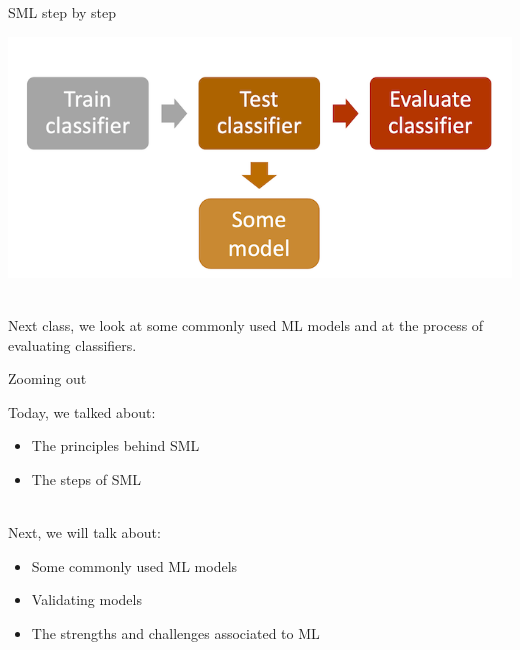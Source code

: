 \documentclass[handout]{beamer}
\begin{document}
	\begin{frame}{SML step by step}
		
		\begin{center}
			\includegraphics[width=\linewidth,height=\textheight,keepaspectratio]{../pictures/MLprocess_model.png} \\\
			
			Next class, we look at some commonly used ML models and at the process of evaluating classifiers.
		\end{center}
		

		
		
		
	\end{frame}
	
	
	\begin{frame}{Zooming out} 
		
		Today, we talked about:
		\begin{itemize}
			\item The principles behind SML
			\item The steps of SML \\\
		\end{itemize}
		
		Next, we will talk about:
		\begin{itemize}
			\item Some commonly used ML models
			\item Validating models
			\item The strengths and challenges associated to ML
		\end{itemize}
		
	\end{frame}
	
	
\end{document}
